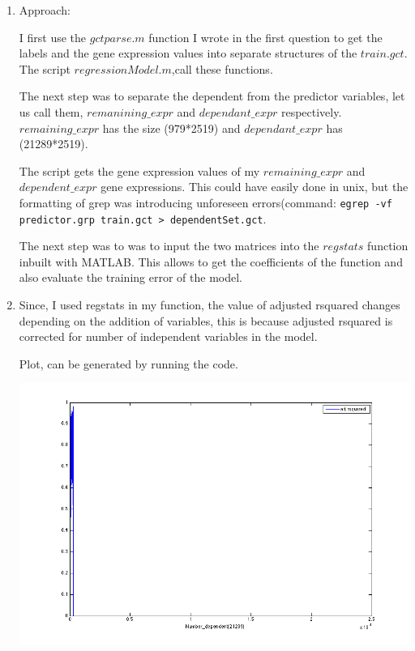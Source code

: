 \documentclass[11pt]{article}
\begin{document}
\begin{enumerate}

\item{}

Approach:

I first use the $gctparse.m$ function I wrote in the first question to get the labels and the gene expression values into separate structures of the $train.gct$. The script $regressionModel.m$,call these functions. 

The next step was to separate the dependent from the predictor variables, let us call them, $remanining\_expr$ and $dependant\_expr$ respectively. $remaining\_expr$ has the size (979*2519) and $dependant\_expr$ has (21289*2519).  

The script gets the gene expression values of my $remaining\_expr$ and $dependent\_expr$ gene expressions. This could have easily done in unix, but the formatting of grep was introducing unforeseen errors(command: {\tt egrep -vf predictor.grp train.gct > dependentSet.gct}. 

The next step was to was to input the two matrices into the $regstats$ function inbuilt with MATLAB. This allows to get the coefficients of the function and also evaluate the training error of the model.



\item

Since, I used regstats in my function, the value of adjusted rsquared changes depending on the addition of variables, this is because adjusted rsquared is corrected for number of independent variables in the model.

Plot, can be generated by running the code.

\includegraphics[scale=0.5]{sample300.png}


\end{enumerate}
\end{document}
